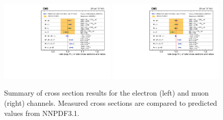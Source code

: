 \begin{figure}[htpb]
\includegraphics[width=0.49\textwidth]{plots/Results/xsecSummary5TeV_ele.pdf}
\includegraphics[width=0.49\textwidth]{plots/Results/xsecSummary5TeV_muon.pdf}
\caption{Summary of cross section results for the \sg electron (left) and muon (right) channels. Measured cross sections are compared to predicted values from NNPDF3.1.}
\label{fig:xs:5}
\end{figure}